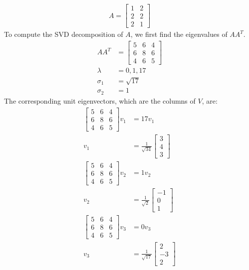 \documentclass{article}
\begin{document}
\begin{align*}
    A = \begin{bmatrix}
        1 & 2 \\ 2 & 2 \\ 2 & 1
    \end{bmatrix}
\end{align*}
To compute the SVD decomposition of $A$, we first find the eigenvalues of $AA^T$.
\begin{align*}
    AA^T & = \begin{bmatrix}
        5 & 6 & 4 \\ 6 & 8 & 6 \\ 4 & 6 & 5
    \end{bmatrix} \\
    \lambda & = 0, 1, 17 \\
    \sigma_1 & = \sqrt{17} \\
    \sigma_2 & = 1
\end{align*}
The corresponding unit eigenvectors, which are the columns of $V$, are:
\begin{align*}
    \begin{bmatrix}
        5 & 6 & 4 \\ 6 & 8 & 6 \\ 4 & 6 & 5
    \end{bmatrix}v_1 & = 17v_1 \\
    v_1 & = \frac{1}{\sqrt{34}}\begin{bmatrix}
        3 \\ 4 \\ 3
    \end{bmatrix} \\
    \begin{bmatrix}
        5 & 6 & 4 \\ 6 & 8 & 6 \\ 4 & 6 & 5
    \end{bmatrix}v_2 & = 1v_2 \\
    v_2 & = \frac{1}{\sqrt{2}}\begin{bmatrix}
        -1 \\ 0 \\ 1
    \end{bmatrix} \\
    \begin{bmatrix}
        5 & 6 & 4 \\ 6 & 8 & 6 \\ 4 & 6 & 5
    \end{bmatrix}v_3 & = 0v_3 \\
    v_3 & = \frac{1}{\sqrt{17}}\begin{bmatrix}
        2 \\ -3 \\ 2
    \end{bmatrix}
\end{align*}
\end{document}
